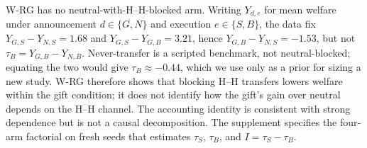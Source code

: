 \documentclass[sigconf,anonymous]{aamas}
\begin{document}
W-RG has no neutral-with-H--H-blocked arm.  Writing $Y_{d,e}$ for mean welfare
under announcement $d\in\{G,N\}$ and execution $e\in\{S,B\}$, the data fix
$Y_{G,S}-Y_{N,S}=1.68$ and $Y_{G,S}-Y_{G,B}=3.21$, hence
$Y_{G,B}-Y_{N,S}=-1.53$, but not $\tau_B=Y_{G,B}-Y_{N,B}$.  Never-transfer is a
scripted benchmark, not neutral-blocked; equating the two would give
$\tau_B\approx-0.44$, which we use only as a prior for sizing a new study.
W-RG therefore shows that blocking H--H transfers lowers welfare within the
gift condition; it does not identify how the gift's gain over neutral depends
on the H--H channel.  The accounting identity is consistent with strong
dependence but is not a causal decomposition.  The supplement specifies the
four-arm factorial on fresh seeds that estimates $\tau_S$, $\tau_B$, and
$I=\tau_S-\tau_B$.
\end{document}
